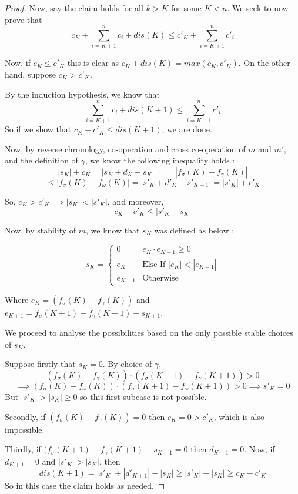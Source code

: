 \documentclass[runningheads]{llncs}
\newcounter{cases}
\begin{document}
\begin{proof}
    Now, say the claim holds for all $k > K$ for some $K < n$. 
    We seek to now prove that $$c_K + \sum_{i = K+1}^{n} c_i + dis(K) \leq c'_K + \sum_{i = K+1}^{n} c'_i$$
    
    Now, if $c_K \leq c'_K$ this is clear as $c_K + dis(K) = max(c_K, c'_K)$. 
    On the other hand, suppose $c_K > c'_K$. 
    
    By the induction hypothesis, we know that $$\sum_{i = K+1}^{n} c_i + dis(K+1) \leq \sum_{i = K+1}^{n} c'_i$$ 
    So if we show that $c_K - c'_K \leq dis(K+1)$, we are done. 
    
    Now, by reverse chronology, co-operation and cross co-operation of $m$ and $m'$, and the definition of $\gamma$, we know the following inequality holds : $$|s_{K}| + c_K = |s_K + d_K - s_{K-1}| = |f_\sigma(K) - f_\gamma(K)|$$ $$ \leq |f_\sigma(K) - f_\omega(K)| =  |s'_K + d'_K - s'_{K-1}| = |s'_{K}| + c'_K$$
    
    So, $c_K > c'_K \implies |s_K| < |s'_K|$, and moreover, $$c_K - c'_K \leq |s'_K - s_K|$$
    
    Now, by stability of $m$, we know that $s_K$ was defined as below : 
    
    $$s_K = \begin{cases}
    0 & e_K \cdot e_{K+1} \geq 0 \\
    e_K & \textrm{Else If } |e_K| < |e_{K+1}|\\
    e_{K+1} & \textrm{Otherwise}
    \end{cases}$$
    
    Where $e_K =  (f_\sigma(K) - f_\gamma(K))$ and $e_{K+1} = f_\sigma(K+1) - f_\gamma(K+1) - s_{K+1}$. 
    
    We proceed to analyse the possibilities based on the only possible stable choices of $s_K$.  
    
    Suppose firstly that $s_K = 0$. By choice of $\gamma$, $$(f_\sigma(K) - f_\gamma(K))\cdot (f_\sigma(K+1) - f_\gamma(K+1)) > 0 $$$$ \implies (f_\sigma(K) - f_\omega(K))\cdot (f_\sigma(K+1) - f_\omega(K+1)) > 0 \implies s'_K = 0$$
    But $|s'_K| >|s_K| \geq 0 $ so this first subcase is not possible. 
    
    Secondly, if $(f_\sigma(K) - f_\gamma(K)) = 0$ then  $ c_K = 0 > c'_K$, which is also impossible. 

    Thirdly, if $(f_\sigma(K+1) - f_\gamma(K+1) - s_{K+1} = 0 $ then $d_{K+1} = 0 $. 
    Now, if $d_{K+1} = 0 $ and $|s'_K| > |s_K|$, then  $$dis(K+1) = |s'_K| + |d'_{K+1}| - |s_K| \geq |s'_K|  - |s_K| \geq c_K - c'_K$$ So in this case the claim holds as needed. 
    

\end{proof}
\end{document}
